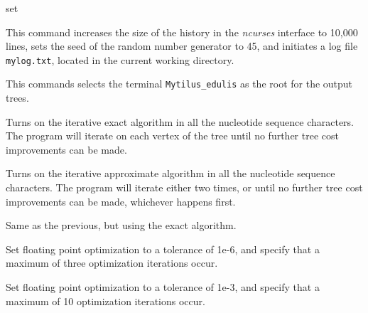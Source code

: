 \begin{command}{set}{}
    \begin{poyexamples}
            {This command increases the size of the history in the \emph{ncurses}
            interface to 10,000 lines, sets the seed of the random number generator to 45,
            and initiates a log file \texttt{mylog.txt}, located in the current
            working directory.}
            
            {This commands selects the terminal \texttt{Mytilus\_edulis} as the root
            for the output trees.}
            
            {Turns on the iterative exact algorithm in all the nucleotide
            sequence characters. The program will iterate on each vertex of the
            tree until no further tree cost improvements can be made.}

            {Turns on the iterative approximate algorithm in all the nucleotide
            sequence characters. The program will iterate either two times, or
            until no further tree cost improvements can be made, whichever
            happens first.}

            {Same as the previous, but using the exact algorithm.}
            
            {Set floating point optimization to a tolerance of 1e-6, and specify that
            a maximum of three optimization iterations occur.}
            
            {Set floating point optimization to a tolerance of 1e-3, and specify that
            a maximum of 10 optimization iterations occur.}

     \end{poyexamples}
     
    \begin{poyalso}
    \end{poyalso}

\end{command}



   
